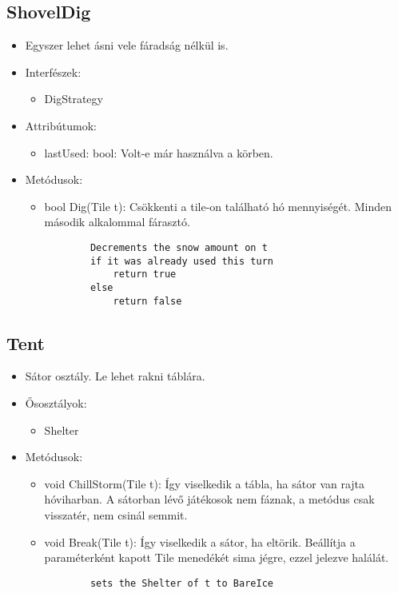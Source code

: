 \subsection{ShovelDig}
\begin{itemize}
	\item Egyszer lehet ásni vele fáradság nélkül is.
	\item Interfészek:
	\begin{itemize}
		\item DigStrategy
	\end{itemize}
	\item Attribútumok:
	\begin{itemize}
		\item lastUsed: bool: Volt-e már használva a körben.
	\end{itemize}
	\item Metódusok:
	\begin{itemize}
		\item bool Dig(Tile t): Csökkenti a tile-on található hó mennyiségét. Minden második alkalommal fárasztó.
		\begin{lstlisting}
		Decrements the snow amount on t
		if it was already used this turn
			return true
		else 
			return false
		\end{lstlisting}
	\end{itemize}
\end{itemize}

\subsection{Tent}
\begin{itemize}
	\item Sátor osztály. Le lehet rakni táblára.
	\item Ősosztályok:
	\begin{itemize}
		\item Shelter
	\end{itemize}
	\item Metódusok:
	\begin{itemize}
		\item void ChillStorm(Tile t): Így viselkedik a tábla, ha sátor van rajta hóviharban. A sátorban lévő játékosok nem fáznak, a metódus csak visszatér, nem csinál semmit.
		\item void Break(Tile t): Így viselkedik a sátor, ha eltörik. Beállítja a paraméterként kapott Tile menedékét sima jégre, ezzel jelezve halálát.
		\begin{lstlisting}
		sets the Shelter of t to BareIce
		\end{lstlisting}
	\end{itemize}
\end{itemize}

